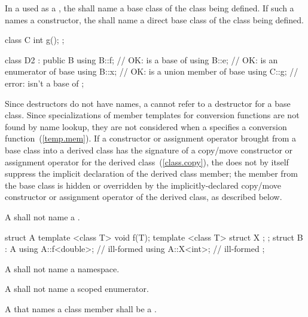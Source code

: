 \pnum
In a  used as a
, the 
shall name a base class of the class being defined. If such a
 names a constructor, the
 shall name a direct base class of the class
being defined.
\enterexample

\begin{codeblock}
class C {
  int g();
};

class D2 : public B {
  using B::f;                   // OK:  is a base of 
  using B::e;                   // OK:  is an enumerator of base 
  using B::x;                   // OK:  is a union member of base 
  using C::g;                   // error:  isn't a base of 
};
\end{codeblock}
\exitexample

\pnum
\enternote
Since destructors do not have names, a
 cannot refer to a
destructor for a base class. Since specializations of member templates
for conversion functions are not found by name lookup, they are not
considered when a  specifies a conversion
function~(\ref{temp.mem}).
\exitnote
If a constructor or assignment operator brought from a base class into a derived class
has the signature of a copy/move constructor or assignment operator
for the derived class~(\ref{class.copy}),
the  does not by itself
suppress the implicit declaration of the derived class member;
the member from the base class is hidden or overridden
by the implicitly-declared copy/move constructor or assignment operator
of the derived class, as described below.

\pnum
A  shall not name a .
\enterexample

\begin{codeblock}
struct A {
  template <class T> void f(T);
  template <class T> struct X { };
};
struct B : A {
  using A::f<double>;           // ill-formed
  using A::X<int>;              // ill-formed
};
\end{codeblock}
\exitexample

\pnum
A  shall not name a namespace.

\pnum
A  shall not name a scoped enumerator.

\pnum
A  that names a class member shall be a
.
\enterexample


